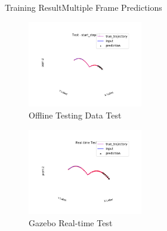 \documentclass{beamer}
\begin{document}
	\begin{frame}{Training Result}{Multiple Frame Predictions}
	\begin{minipage}{5.5cm}
	\begin{figure}
	\includegraphics[width=5cm]{test_multi_1.png}
	\caption{Offline Testing Data Test}
	\end{figure}
	\end{minipage}
	\begin{minipage}{5.5cm}
	\begin{figure}
	\includegraphics[width=5cm]{m_real_time_test.png}
	\caption{Gazebo Real-time Test}
	\end{figure}
	\end{minipage}	
	\end{frame}
\end{document}
